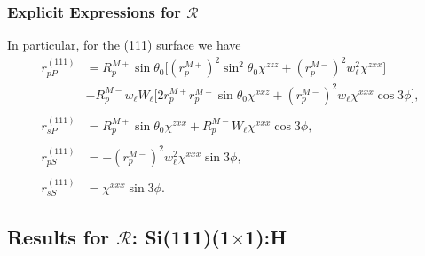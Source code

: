 \documentclass{beamer}
\begin{document}
\begin{frame}
\frametitle{Explicit Expressions for $\mathcal{R}$}
In particular, for the (111) surface we have
\begin{align*}
r^{(111)}_{pP} &= 
R^{M+}_{p}\sin\theta_{0}
\Big[
  \left(r^{M+}_{p}\right)^{2}\sin^{2}\theta_{0}\chi^{zzz}
+ \left(r^{M-}_{p}\right)^{2}w^{2}_{\ell}\chi^{zxx}
\Big]\\
&- R^{M-}_{p}w_{\ell}W_{\ell}
\Big[
  2r^{M+}_{p}r^{M-}_{p}\sin\theta_{0}\chi^{xxz}
+ \left(r^{M-}_{p}\right)^{2}w_{\ell}\chi^{xxx}\cos3\phi
\Big],\\\\
r^{(111)}_{sP} &= 
R^{M+}_{p}\sin\theta_{0}\chi^{zxx} +
R^{M-}_{p}W_{\ell}\chi^{xxx}\cos3\phi,\\\\
r^{(111)}_{pS} &= - \left(r^{M-}_{p}\right)^{2}w^{2}_{\ell}\chi^{xxx}\sin3\phi,\\\\
r^{(111)}_{sS} &= \chi^{xxx}\sin3\phi.
\end{align*}
\end{frame}




\subsection{Results for \texorpdfstring{$\mathcal{R}$}{R}: 
Si(111)(1\texorpdfstring{$\times$}{x}1):H}
\end{document}

